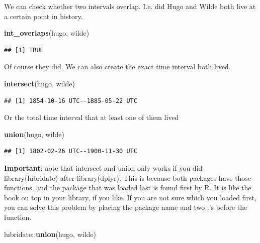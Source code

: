 \documentclass[]{tufte-book}
\newenvironment{Shaded}{}{}
\newcommand{\KeywordTok}[1]{\textcolor[rgb]{0.00,0.44,0.13}{\textbf{#1}}}
\newcommand{\NormalTok}[1]{#1}
\newcommand{\OperatorTok}[1]{\textcolor[rgb]{0.40,0.40,0.40}{#1}}
\begin{document}
We can check whether two intervals overlap. I.e. did Hugo and Wilde both live at a certain point in history.

\begin{Shaded}
\begin{Highlighting}[]
\KeywordTok{int_overlaps}\NormalTok{(hugo, wilde)}
\end{Highlighting}
\end{Shaded}

\begin{verbatim}
## [1] TRUE
\end{verbatim}

Of course they did. We can also create the exact time interval both lived.

\begin{Shaded}
\begin{Highlighting}[]
\KeywordTok{intersect}\NormalTok{(hugo, wilde)}
\end{Highlighting}
\end{Shaded}

\begin{verbatim}
## [1] 1854-10-16 UTC--1885-05-22 UTC
\end{verbatim}

Or the total time interval that at least one of them lived

\begin{Shaded}
\begin{Highlighting}[]
\KeywordTok{union}\NormalTok{(hugo, wilde)}
\end{Highlighting}
\end{Shaded}

\begin{verbatim}
## [1] 1802-02-26 UTC--1900-11-30 UTC
\end{verbatim}

\textbf{Important}: note that intersect and union only works if you did library(lubridate) after library(dplyr). This is because both packages have those functions, and the package that was loaded last is found first by R. It is like the book on top in your library, if you like. If you are not sure which you loaded first, you can solve this problem by placing the package name and two :'s before the function.

\begin{Shaded}
\begin{Highlighting}[]
\NormalTok{lubridate}\OperatorTok{::}\KeywordTok{union}\NormalTok{(hugo, wilde)}
\end{Highlighting}
\end{Shaded}
\end{document}
